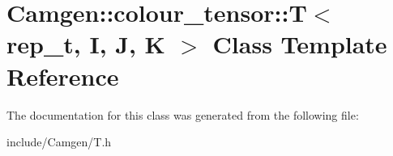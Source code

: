 \hypertarget{a00536}{}\section{Camgen\+:\+:colour\+\_\+tensor\+:\+:T$<$ rep\+\_\+t, I, J, K $>$ Class Template Reference}
\label{a00536}


The documentation for this class was generated from the following file\+:\begin{DoxyCompactItemize}
\item 
include/\+Camgen/T.\+h\end{DoxyCompactItemize}
